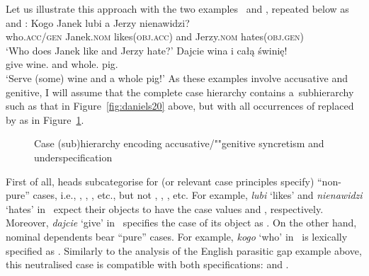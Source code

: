 \documentclass[output=paper
	        ,collection
	        ,collectionchapter
 	        ,biblatex
                ,babelshorthands
                ,newtxmath
                ,draftmode
                ,colorlinks, citecolor=brown
]{./langsci/langscibook}
\begin{document}
\begin{exe}
\begin{xlist}
\begin{exe}
\begin{xlist}
Let us illustrate this approach with the two  examples~ and
, repeated below as  and :
\eal
\ex
\label{ex:syn:pc:again} 
\gll Kogo Janek lubi a Jerzy nienawidzi? \\
     who.\textsc{acc/gen} Janek.\textsc{nom} likes(\textsc{obj.acc}) and Jerzy.\textsc{nom} hates(\textsc{obj.gen})\hspace{-6pt}\\
\glt  `Who does Janek like and Jerzy hate?’
\ex\label{ex:dis:pl:again}
\gll Dajcie wina i całą świnię! \\
    give wine.\GEN{} and whole.\ACC{} pig.\ACC{}\\
\glt `Serve (some) wine and a whole pig!’
\zl
As these examples involve accusative and genitive, I will assume that the complete case hierarchy
contains a~subhierarchy such as that in Figure~\ref{fig:daniels20} above, but with all occurrences of
 replaced by  as in Figure~\ref{fig:case4}.
\begin{figure}
\caption{Case (sub)hierarchy encoding accusative/""genitive syncretism and underspecification}\label{fig:case4}
\end{figure}


First of all, heads subcategorise for (or relevant case principles specify) “non-pure” cases, i.e., , , , etc., but not , , , etc.  For example, \emph{lubi} `likes’ and \emph{nienawidzi} `hates’ in~ expect their objects to have the case values  and , respectively.  Moreover, \emph{dajcie} `give’ in~ specifies the case of its object as .  On the other hand, nominal dependents bear “pure” cases.  For example, \emph{kogo} `who’ in~ is lexically specified as .  Similarly to the analysis of the English parasitic gap example above, this neutralised case is compatible with both specifications:  and .


\end{xlist}
\end{exe}
\end{xlist}
\end{exe}
\end{document}
